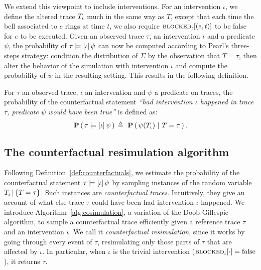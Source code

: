 We extend this viewpoint to include interventions. For an
intervention $\iota$, we define the altered trace ${T_\iota}{}$ much in
the same way as $T$, except that each time the bell associated to $e$
rings at time $t$, we also require ${\textsc{blocked}}_{\iota}[(e, t)]$ to be
false for $e$ to be executed.  Given an observed trace $\tau$, an
intervention $\iota$ and a predicate $\psi$,
the probability of $\tau \models [\iota] \, \psi{}$ can now be computed according to Pearl's
three-steps strategy: \ItAbduction{} condition the distribution of
$\Sigma$ by the observation that $T=\tau$, then \ItAction{} alter
the behavior of the simulation with intervention $\iota$ and
\ItPrediction{} compute the probability of $\psi$ in the resulting
setting. This results in the following definition.

\begin{definition}\label{def:counterfactuals}
  For $\tau$ an observed trace, $\iota$ an intervention and $\psi$ a
  predicate on traces, the probability of the counterfactual statement
  \textit{``had intervention $\iota$ happened in trace $\tau$,
    predicate $\psi$ would have been true''} is defined as:
  \[ \PCFST{} \eqdef \ \ProbParen{\psi(\ATRAJ{}) \ |\ T = \tau}. \]
\end{definition}

\subsection{The counterfactual resimulation algorithm}
\label{subsec:cosim-algo}

Following Definition~\ref{def:counterfactuals}, we estimate the
probability of the counterfactual statement
$\tau \models [\iota] \, \psi{}$ by sampling instances of the random
variable ${T_\iota\,|\,\{T=\tau\}}{}$. Such instances are \emph{counterfactual
  traces}. Intuitively, they give an account of what else trace $\tau$
could have been had intervention $\iota$ happened.  We introduce
Algorithm~\ref{alg:cosimulation}, a variation of the Doob-Gillespie
algorithm, to sample a counterfactual trace efficiently given a
reference trace $\tau$ and an intervention $\iota$. We call it
\emph{counterfactual resimulation}, since it works by going
through every event of $\tau$, resimulating only those parts of $\tau$
that are affected by $\iota$. In particular, when $\iota$ is
the trivial intervention (${\textsc{blocked}}_{\iota}[\cdot] = \text{false}$), it
returns $\tau$.

